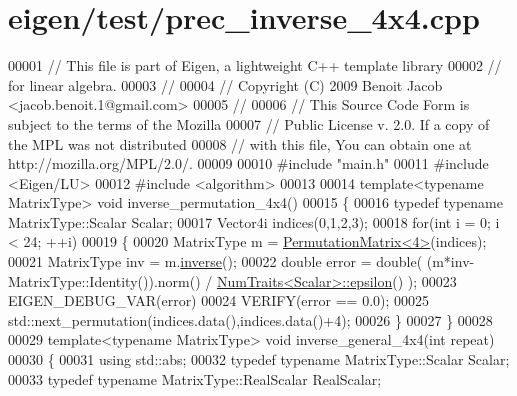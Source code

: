 \hypertarget{eigen_2test_2prec__inverse__4x4_8cpp_source}{}\section{eigen/test/prec\+\_\+inverse\+\_\+4x4.cpp}
\label{eigen_2test_2prec__inverse__4x4_8cpp_source}

\begin{DoxyCode}
00001 \textcolor{comment}{// This file is part of Eigen, a lightweight C++ template library}
00002 \textcolor{comment}{// for linear algebra.}
00003 \textcolor{comment}{//}
00004 \textcolor{comment}{// Copyright (C) 2009 Benoit Jacob <jacob.benoit.1@gmail.com>}
00005 \textcolor{comment}{//}
00006 \textcolor{comment}{// This Source Code Form is subject to the terms of the Mozilla}
00007 \textcolor{comment}{// Public License v. 2.0. If a copy of the MPL was not distributed}
00008 \textcolor{comment}{// with this file, You can obtain one at http://mozilla.org/MPL/2.0/.}
00009 
00010 \textcolor{preprocessor}{#include "main.h"}
00011 \textcolor{preprocessor}{#include <Eigen/LU>}
00012 \textcolor{preprocessor}{#include <algorithm>}
00013 
00014 \textcolor{keyword}{template}<\textcolor{keyword}{typename} MatrixType> \textcolor{keywordtype}{void} inverse\_permutation\_4x4()
00015 \{
00016   \textcolor{keyword}{typedef} \textcolor{keyword}{typename} MatrixType::Scalar Scalar;
00017   Vector4i indices(0,1,2,3);
00018   \textcolor{keywordflow}{for}(\textcolor{keywordtype}{int} i = 0; i < 24; ++i)
00019   \{
00020     MatrixType m = \hyperlink{group___core___module_class_eigen_1_1_permutation_matrix}{PermutationMatrix<4>}(indices);
00021     MatrixType inv = m.\hyperlink{group___core___module_adb9af427f317202366c2832876064eb3}{inverse}();
00022     \textcolor{keywordtype}{double} error = double( (m*inv-MatrixType::Identity()).norm() / 
      \hyperlink{group___core___module_struct_eigen_1_1_num_traits}{NumTraits<Scalar>::epsilon}() );
00023     EIGEN\_DEBUG\_VAR(error)
00024     VERIFY(error == 0.0);
00025     std::next\_permutation(indices.data(),indices.data()+4);
00026   \}
00027 \}
00028 
00029 \textcolor{keyword}{template}<\textcolor{keyword}{typename} MatrixType> \textcolor{keywordtype}{void} inverse\_general\_4x4(\textcolor{keywordtype}{int} repeat)
00030 \{
00031   \textcolor{keyword}{using} std::abs;
00032   \textcolor{keyword}{typedef} \textcolor{keyword}{typename} MatrixType::Scalar Scalar;
00033   \textcolor{keyword}{typedef} \textcolor{keyword}{typename} MatrixType::RealScalar RealScalar;

\end{DoxyCode}

